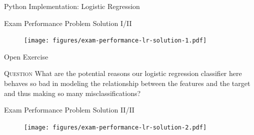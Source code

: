 \documentclass[document.tex]{subfiles}
\begin{document}
    \begin{frame}{Python Implementation: Logistic Regression}
        
    \end{frame}

    \begin{frame}{Exam Performance Problem Solution I/II}
        \begin{figure}
            \label{fig:exam-performance-lr-solution-1}
            \texttt{[image: figures/exam-performance-lr-solution-1.pdf]}
        \end{figure}
    \end{frame}

        \begin{frame}{Open Exercise }
        \begin{alertblock}{\textsc{Question}}
            What are the potential reasons our logistic regression classifier here behaves so bad in modeling the relationship between the features and the target and thus making so many misclassifications?
        \end{alertblock}
    \end{frame}

    \begin{frame}{Exam Performance Problem Solution II/II}
        \begin{figure}
            \label{fig:exam-performance-lr-solution-2}
            \texttt{[image: figures/exam-performance-lr-solution-2.pdf]}
        \end{figure}
    \end{frame}
\end{document}
